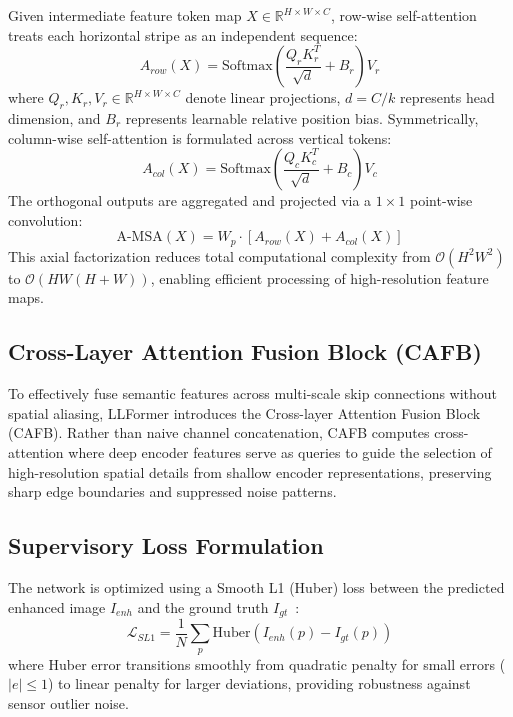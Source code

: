 \documentclass[conference]{IEEEtran}
\begin{document}
Given intermediate feature token map $X \in \mathbb{R}^{H \times W \times C}$, row-wise self-attention treats each horizontal stripe as an independent sequence:
\begin{equation}
  A_{row}(X) = \mathrm{Softmax}\left(\frac{Q_r K_r^T}{\sqrt{d}} + B_r\right) V_r
  \label{eq:row_attn}
\end{equation}
where $Q_r, K_r, V_r \in \mathbb{R}^{H \times W \times C}$ denote linear projections, $d = C / k$ represents head dimension, and $B_r$ represents learnable relative position bias. Symmetrically, column-wise self-attention is formulated across vertical tokens:
\begin{equation}
  A_{col}(X) = \mathrm{Softmax}\left(\frac{Q_c K_c^T}{\sqrt{d}} + B_c\right) V_c
  \label{eq:col_attn}
\end{equation}
The orthogonal outputs are aggregated and projected via a $1\times1$ point-wise convolution:
\begin{equation}
  \text{A-MSA}(X) = W_p \cdot \left[ A_{row}(X) + A_{col}(X) \right]
  \label{eq:amsa_fuse}
\end{equation}
This axial factorization reduces total computational complexity from $\mathcal{O}(H^2W^2)$ to $\mathcal{O}(HW(H+W))$, enabling efficient processing of high-resolution feature maps.

\subsection{Cross-Layer Attention Fusion Block (CAFB)}
To effectively fuse semantic features across multi-scale skip connections without spatial aliasing, LLFormer introduces the Cross-layer Attention Fusion Block (CAFB). Rather than naive channel concatenation, CAFB computes cross-attention where deep encoder features serve as queries to guide the selection of high-resolution spatial details from shallow encoder representations, preserving sharp edge boundaries and suppressed noise patterns.

\subsection{Supervisory Loss Formulation}
The network is optimized using a Smooth L1 (Huber) loss between the predicted enhanced image $I_{enh}$ and the ground truth $I_{gt}$~\cite{zhao2016loss}:
\begin{equation}
  \mathcal{L}_{SL1} = \frac{1}{N} \sum_{p} \mathrm{Huber}\left( I_{enh}(p) - I_{gt}(p) \right)
  \label{eq:sl1}
\end{equation}
where Huber error transitions smoothly from quadratic penalty for small errors ($|e| \le 1$) to linear penalty for larger deviations, providing robustness against sensor outlier noise.
\end{document}
